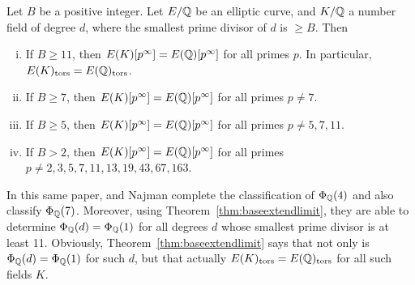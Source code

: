 \begin{thm} \label{thm:baseextendlimit}
Let $B$ be a positive integer. Let $E/\mathbb{Q}$ be an elliptic curve, and $K/\mathbb{Q}$ a number field of degree $d$, where the smallest prime divisor of $d$ is $\geq B$. Then
	\begin{enumerate}[(i)]
	\item If $B \geq 11$, then $E(K)[p^\infty]= E(\mathbb{Q})[p^\infty]$ for all primes $p$. In particular, $E(K)_{\text{tors}}= E(\mathbb{Q})_{\text{tors}}$.
	\item If $B \geq 7$, then $E(K)[p^\infty]= E(\mathbb{Q})[p^\infty]$ for all primes $p \neq 7$.
	\item If $B \geq 5$, then $E(K)[p^\infty]= E(\mathbb{Q})[p^\infty]$ for all primes $p \neq 5, 7, 11$.
	\item If $B > 2$, then $E(K)[p^\infty]= E(\mathbb{Q})[p^\infty]$ for all primes $p \neq 2, 3, 5, 7, 11, 13, 19, 43, 67, 163$.
	\end{enumerate}
\end{thm}


In this same paper, \gonjim{} and Najman complete the classification of $\Phi_{\mathbb{Q}}(4)$ and also classify $\Phi_{\mathbb{Q}}(7)$. Moreover, using Theorem~\ref{thm:baseextendlimit}, they are able to determine $\Phi_{\mathbb{Q}}(d)= \Phi_{\mathbb{Q}}(1)$ for all degrees $d$ whose smallest prime divisor is at least 11. Obviously, Theorem~\ref{thm:baseextendlimit} says that not only is $\Phi_{\mathbb{Q}}(d)= \Phi_{\mathbb{Q}}(1)$ for such $d$, but that actually $E(K)_{\text{tors}}= E(\mathbb{Q})_{\text{tors}}$ for all such fields $K$. 


